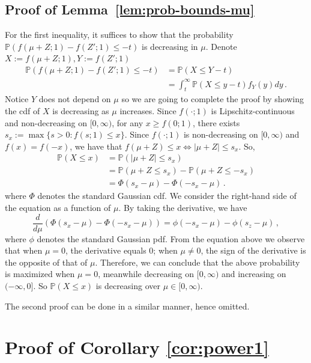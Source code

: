 \documentclass[11pt]{article}
\newcommand{\Prob}{\mathbb{P}}
\begin{document}
\subsection{Proof of Lemma~\ref{lem:prob-bounds-mu}}
    For the first inequality, it suffices to show that the probability $\Prob(f(\mu+Z;1)-f(Z';1)\leq -t)$ is decreasing in $\mu$. Denote $X:=f(\mu+Z;1), Y := f(Z';1)$
    \begin{align*}
        \Prob(f(\mu+Z;1)-f(Z';1)\leq -t) &= \Prob(X\leq Y-t)\\
            &= \int_t^\infty \Prob(X\leq y-t)f_Y(y)dy\,.
    \end{align*}
    Notice $Y$ does not depend on $\mu$ so we are going to complete the proof by showing the cdf of $X$ is decreasing as $\mu$ increases. Since $f(\cdot;1)$ is Lipschitz-continuous and non-decreasing on $[0,\infty)$, for any $x\ge f(0;1) $, there exists $s_x := \max\{s>0:f(s;1)\le x\}$. Since $f(\cdot;1)$ is non-decreasing on $[0,\infty)$ and $f(x) = f(-x)$, we have that $f(
    \mu+Z)\le x \iff |\mu+Z|\le s_x$. So,
    \begin{align*}
        \Prob(X\leq x)  &= \Prob(|\mu+Z|\leq s_x)\\
        &= \Prob(\mu+Z\le s_x)-\Prob(\mu+Z\le -s_x)\\
        &=\Phi( s_x-\mu)-\Phi(-s_x-\mu)\,.
    \end{align*}
    where $\Phi$ denotes the standard Gaussian cdf. We consider the right-hand side of the equation as a function of $\mu$. By taking the derivative, we have
    \[
    \frac{d}{d\mu}(\Phi(s_x-\mu)-\Phi(-s_x-\mu))=\phi(-s_x-\mu)-\phi(s_z-\mu)\,,
    \]
    where $\phi$ denotes the standard Gaussian pdf. From the equation above we observe that when $\mu=0$, the derivative equals 0; when $\mu\neq 0$, the sign of the derivative is the opposite of that of $\mu$. Therefore, we can conclude that the above probability is maximized when $\mu=0$, meanwhile decreasing on $[0,\infty)$ and increasing on $(-\infty,0]$. So $\Prob(X\le x)$ is decreasing over $\mu\in[0,\infty)$.

    The second proof can be done in a similar manner, hence omitted.
\section{Proof of Corollary \ref{cor:power1}}\label{pf:power1}
\end{document}
